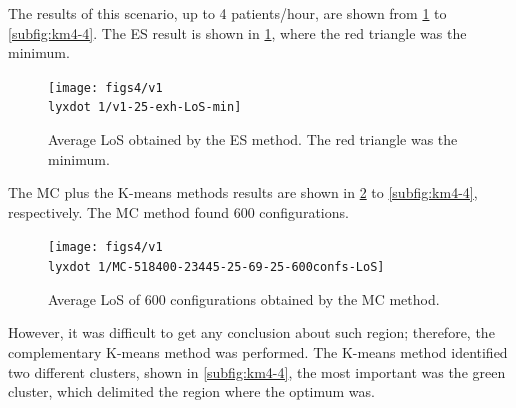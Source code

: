 The results of this scenario, up to 4 patients/hour, are shown from
\ref{subfig:es4-4} to \ref{subfig:km4-4}. The ES result is shown
in \ref{subfig:es4-4}, where the red triangle was the minimum. 
\begin{figure}[H]
\centering{}\texttt{[image: figs4/v1\\lyxdot 1/v1-25-exh-LoS-min]}\caption{Average LoS obtained by the ES method. The red triangle was the minimum.\label{subfig:es4-4}}
\end{figure}


The MC plus the K-means methods results are shown in \ref{subfig:mc4-4}
to \ref{subfig:km4-4}, respectively. The MC method found 600 configurations.
\begin{figure}[H]
\centering{}\texttt{[image: figs4/v1\\lyxdot 1/MC-518400-23445-25-69-25-600confs-LoS]}\caption{Average LoS of 600 configurations obtained by the MC method.\label{subfig:mc4-4}}
\end{figure}
 However, it was difficult to get any conclusion about such region;
therefore, the complementary K-means method was performed. The K-means
method identified two different clusters, shown in \ref{subfig:km4-4},
the most important was the green cluster, which delimited the region
where the optimum was.

